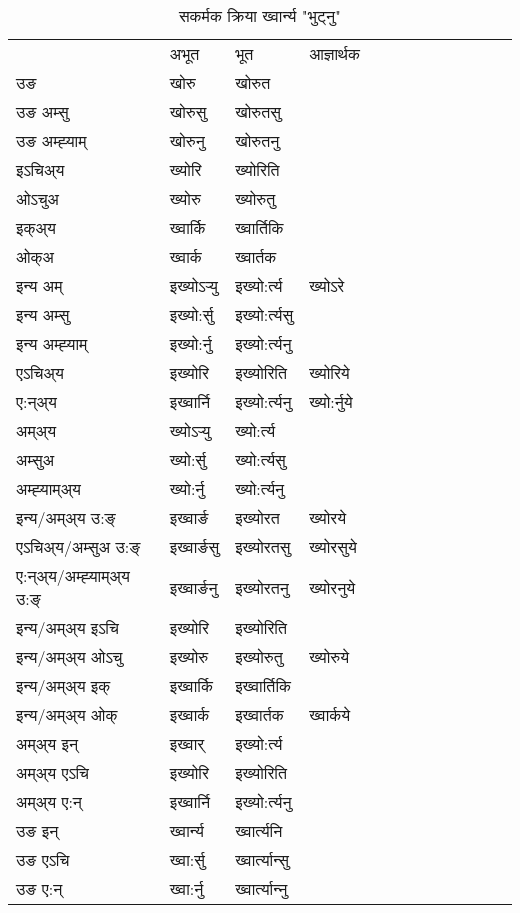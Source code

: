 \begin{table}[H]
\centering
\caption{\label{or.vt} सकर्मक क्रिया  ख्‍वार्न्य  "भुट्नु"  }
\begin{tabular}{l|l|l|l|l|l|l|l|l|l|l|l|l}  \toprule
&अभूत & भूत & आज्ञार्थक \\ 
उङ &खोरु &खोरुत \\ 
उङ अम्सु &खोरुसु &खोरुतसु \\ 
उङ अम्ह्‍याम् &खोरुनु &खोरुतनु \\ 
इऽचिअ्य &ख्योरि &ख्योरिति   \\ 
ओऽचुअ &ख्योरु &ख्योरुतु   \\ 
इक्अ्य &ख्‍वार्कि &ख्‍वार्तिकि   \\ 
ओक्अ &ख्‍वार्क &ख्‍वार्तक   \\ 
इन्य अम् & इख्योऽर्‍यु  & इख्यो:र्त्य &ख्योऽरे  \\ 
इन्य अम्सु & इख्यो:र्सु  & इख्यो:र्त्यसु   \\ 
इन्य अम्ह्‍याम् & इख्यो:र्नु  & इख्यो:र्त्यनु   \\ 
एऽचिअ्य & इख्योरि & इख्योरिति &ख्योरिये    \\ 
ए:न्अ्य & इख्‍वार्नि  & इख्यो:र्त्यनु &ख्यो:र्नुये  \\ 
अम्अ्य & ख्योऽर्‍यु  & ख्यो:र्त्य  \\ 
अम्सुअ & ख्यो:र्सु & ख्यो:र्त्यसु  \\ 
अम्ह्‍याम्अ्य & ख्यो:र्नु  & ख्यो:र्त्यनु \\ 
\midrule
इन्य/अम्अ्य उ:ङ्‌&इख्‍वार्ङ & इख्योरत &ख्योरये \\ 
एऽचिअ्य/अम्सुअ उ:ङ्‌ &इख्‍वार्ङसु & इख्योरतसु &ख्योरसुये \\ 
ए:न्अ्य/अम्ह्‍याम्अ्य उ:ङ्‌ &इख्‍वार्ङनु & इख्योरतनु &ख्योरनुये \\ 
इन्य/अम्अ्य इऽचि & इख्योरि & इख्योरिति    \\ 
इन्य/अम्अ्य ओऽचु & इख्योरु & इख्योरुतु  &ख्योरुये  \\ 
इन्य/अम्अ्य इक् & इख्‍वार्कि & इख्‍वार्तिकि   \\ 
इन्य/अम्अ्य ओक् & इख्‍वार्क & इख्‍वार्तक  &ख्‍वार्कये  \\ 
अम्अ्य इन् & इख्‍वार् & इख्यो:र्त्य   \\ 
अम्अ्य एऽचि & इख्योरि & इख्योरिति    \\ 
अम्अ्य ए:न् & इख्‍वार्नि  & इख्यो:र्त्यनु  \\ 
\midrule
उङ इन् & ख्‍वार्न्य  & ख्‍वार्त्यनि  \\ 
उङ एऽचि & ख्‍वा:र्सु  & ख्‍वार्त्यान्सु   \\ 
उङ ए:न्& ख्‍वा:र्नु  & ख्‍वार्त्यान्‍नु   \\ 
\bottomrule
\end{tabular}
\end{table}


